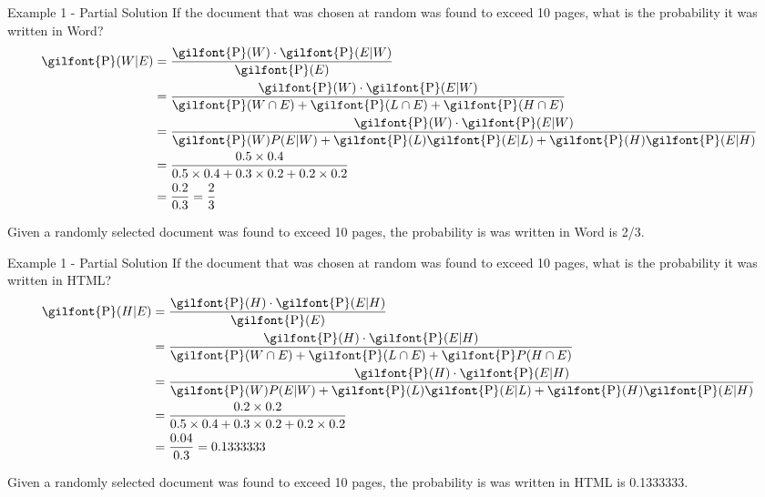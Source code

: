 \documentclass[
  ignorenonframetext,
]{beamer}
\begin{document}
\begin{frame}{Example 1 - Partial Solution}
\protect\hypertarget{example-1---partial-solution-2}{}
If the document that was chosen at random was found to exceed 10 pages,
what is the probability it was written in Word? \[
\begin{aligned}
\textrm{\gilfont{P}}\normalfont (W | E) &= \frac{\textrm{\gilfont{P}}\normalfont (W)\cdot \textrm{\gilfont{P}}\normalfont (E|W)}{\textrm{\gilfont{P}}\normalfont (E)}\\
&=\frac{\textrm{\gilfont{P}}\normalfont (W)\cdot \textrm{\gilfont{P}}\normalfont (E|W)}{\textrm{\gilfont{P}}\normalfont (W \cap E) + \textrm{\gilfont{P}}\normalfont (L\cap E) + \textrm{\gilfont{P}}\normalfont (H \cap E)}\\
&=\frac{\textrm{\gilfont{P}}\normalfont (W)\cdot \textrm{\gilfont{P}}\normalfont (E|W)}{\textrm{\gilfont{P}}\normalfont (W)P(E|W) + \textrm{\gilfont{P}}\normalfont (L)\textrm{\gilfont{P}}\normalfont (E|L) + \textrm{\gilfont{P}}\normalfont (H)\textrm{\gilfont{P}}\normalfont (E|H)}\\
&=\frac{0.5 \times 0.4}{0.5 \times 0.4 + 0.3 \times 0.2 + 0.2 \times 0.2} \\
&=\frac{0.2}{0.3}= \frac{2}{3}
\end{aligned}
\]

\begin{tcolorbox}
Given a randomly selected document was found to exceed 10 pages, the probability is was written in Word is 2/3.
\end{tcolorbox}
\end{frame}

\begin{frame}{Example 1 - Partial Solution}
\protect\hypertarget{example-1---partial-solution-3}{}
If the document that was chosen at random was found to exceed 10 pages,
what is the probability it was written in HTML? \[
\begin{aligned}
\textrm{\gilfont{P}}\normalfont (H | E) &= \frac{\textrm{\gilfont{P}}\normalfont (H)\cdot \textrm{\gilfont{P}}\normalfont (E|H)}{\textrm{\gilfont{P}}\normalfont (E)}\\
&=\frac{\textrm{\gilfont{P}}\normalfont (H)\cdot \textrm{\gilfont{P}}\normalfont (E|H)}{\textrm{\gilfont{P}}\normalfont (W \cap E) + \textrm{\gilfont{P}}\normalfont (L\cap E) + \textrm{\gilfont{P}}\normalfont P(H \cap E)}\\
&=\frac{\textrm{\gilfont{P}}\normalfont (H)\cdot \textrm{\gilfont{P}}\normalfont (E|H)}{\textrm{\gilfont{P}}\normalfont (W)P(E|W) + \textrm{\gilfont{P}}\normalfont (L)\textrm{\gilfont{P}}\normalfont (E|L) + \textrm{\gilfont{P}}\normalfont (H)\textrm{\gilfont{P}}\normalfont (E|H)}\\
&=\frac{0.2 \times 0.2}{0.5 \times 0.4 + 0.3 \times 0.2 + 0.2 \times 0.2} \\
&=\frac{0.04}{0.3}= 0.1333333
\end{aligned}
\]

\begin{tcolorbox}
Given a randomly selected document was found to exceed 10 pages, the probability is was written in HTML is 0.1333333.
\end{tcolorbox}
\end{frame}
\end{document}
